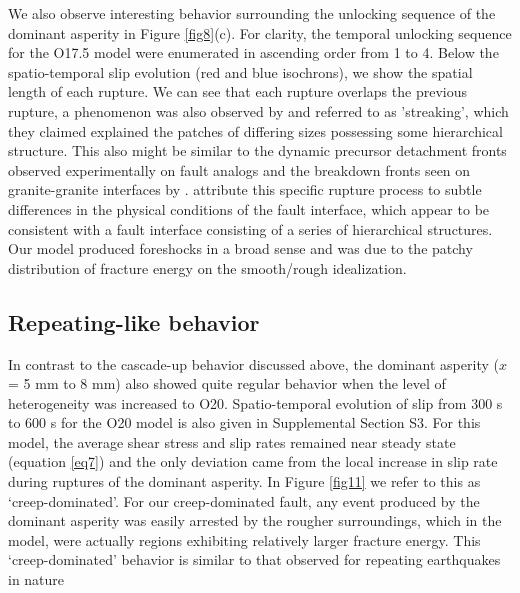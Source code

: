 \documentclass[preprint,1p, 10pt,authoryear]{elsarticle}
\begin{document}

We also observe interesting behavior surrounding the unlocking sequence of the dominant asperity in Figure \ref{fig8}(c). For clarity, the temporal unlocking sequence for the O17.5 model were enumerated in ascending order from 1 to 4.  Below the spatio-temporal slip evolution (red and blue isochrons), we show the spatial length of each rupture. We can see that each rupture overlaps the previous rupture, a phenomenon was also observed by \citet{Okuda2018a} and referred to as 'streaking', which they claimed explained the patches of differing sizes possessing some hierarchical structure. This also might be similar to the dynamic precursor detachment fronts observed experimentally on fault analogs \citep{Rubinstein2004,Rubinstein2006} and the breakdown fronts seen on granite-granite interfaces by \citep{Ke2018}. \citet{Okuda2018a} attribute this specific rupture process to subtle differences in the physical conditions of the fault interface, which appear to be consistent with a fault interface consisting of a series of hierarchical structures. Our model produced foreshocks in a broad sense \citep{Mogi1985} and was due to the patchy distribution of fracture energy on the smooth/rough idealization.

\subsection{Repeating-like behavior}
In contrast to the cascade-up behavior discussed above, the dominant asperity ($x$ = 5 mm to 8 mm) also showed quite regular behavior when the level of heterogeneity was increased to O20.  Spatio-temporal evolution of slip from 300 s to 600 s for the O20 model is also given in Supplemental Section S3. For this model, the average shear stress and slip rates remained near steady state (equation \eqref{eq7}) and the only deviation came from the local increase in slip rate during ruptures of the dominant asperity.  In Figure \ref{fig11} we refer to this as `creep-dominated'. For our creep-dominated fault, any event produced by the dominant asperity was easily arrested by the rougher surroundings, which in the model, were actually regions exhibiting relatively larger fracture energy.  This `creep-dominated' behavior is similar to that observed for repeating earthquakes in nature \citep[e.g., ][]{Beeler2001,Uchida2019}
\end{document}
